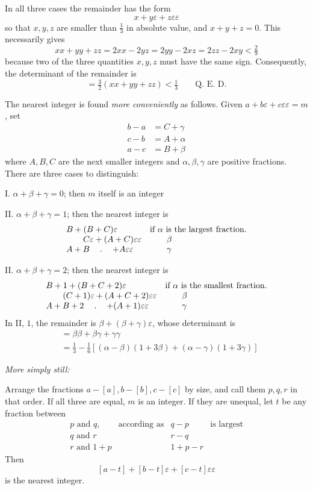 In all three cases the remainder has the form
\[
x+y\varepsilon+z\varepsilon\varepsilon
\]
so that $x,y,z$ are smaller than $\frac13$ in absolute value, and $x+y+z=0$. This necessarily gives
\[
xx+yy+zz=2xx-2yz=2yy-2xz=2zz-2xy<\tfrac29
\]
because two of the three quantities $x,y,z$ must have the same sign. Consequently, the determinant of the remainder is
\[
=\tfrac32(xx+yy+zz)<\tfrac13\qquad\text{Q. E. D.}
\]

The nearest integer is found \emph{more conveniently} as follows. Given $a+b\varepsilon+c\varepsilon\varepsilon=m$, set
\[
\begin{aligned}
b-a&=C+\gamma\\
c-b&=A+\alpha\\
a-c&=B+\beta
\end{aligned}
\]
where $A,B,C$ are the next smaller integers and $\alpha,\beta,\gamma$ are positive fractions.
There are three cases to distinguish:

%
I. $\alpha+\beta+\gamma=0$; then $m$ itself is an integer

II. $\alpha+\beta+\gamma=1$; then the nearest integer is
\[
\begin{array}{ll}
B+(B+C)\varepsilon&\text{if }\alpha\text{ is the largest fraction.}\\
\qquad C\varepsilon+(A+C)\varepsilon\varepsilon&\qquad\beta\\
A+B\quad\mathbin{.}\quad+A\varepsilon\varepsilon&\qquad\gamma
\end{array}
\]

II. $\alpha+\beta+\gamma=2$; then the nearest integer is
\[
\begin{array}{ll}
B+1+(B+C+2)\varepsilon&\text{if }\alpha\text{ is the smallest fraction.}\\
\qquad(C+1)\varepsilon+(A+C+2)\varepsilon\varepsilon&\qquad\beta\\
A+B+2\quad\mathbin{.}\quad+(A+1)\varepsilon\varepsilon&\qquad\gamma
\end{array}
\]
In II, $1$, the remainder is $\beta+(\beta+\gamma)\varepsilon$, whose determinant is
\[
\begin{aligned}
&=\beta\beta+\beta\gamma+\gamma\gamma\\
&=\tfrac13-\tfrac16[(\alpha-\beta)(1+3\beta)+(\alpha-\gamma)(1+3\gamma)]
\end{aligned}
\]

\emph{More simply still:}

Arrange the fractions $a-[a],b-[b],c-[c]$ by size, and call them $p,q,r$ in that order. If all three are equal, $m$ is an integer. If they are unequal, let $t$ be any fraction between
\[
\begin{array}{llll}
p\text{ and }q,&\text{according as}&q-p&\text{is largest}\\
q\text{ and }r&&r-q&\\
r\text{ and }1+p&&1+p-r&
\end{array}
\]
Then
\[
[a-t]+[b-t]\varepsilon+[c-t]\varepsilon\varepsilon
\]
is the nearest integer.

